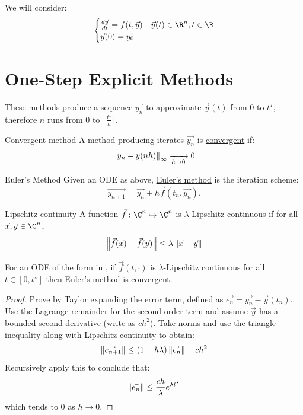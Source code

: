 \documentclass[../Main.tex]{subfiles}
\begin{document}
We will consider:
\begin{equation}
    \begin{cases}
        \frac{d\vec{y}}{dt} = f(t, \vec{y}) & \vec{y}(t) \in \R^n, t \in \R \\
        \vec{y}(0) = \vec{y_0} & 
    \end{cases}
    \label{eqnGeneralODE}
\end{equation}
\section{One-Step Explicit Methods}
These methods produce a sequence $\vec{y_n}$ to approximate $\vec{y}(t)$ from $0$ to $t^\star$, therefore $n$ runs from $0$ to $\lfloor \frac{t^\star}{h}\rfloor$.
\begin{definition}{Convergent method}
    A method producing iterates $\vec{y_n}$ is \underline{convergent} if:
    \begin{equation*}
        \left\|y_n - y(nh)\right\|_{\infty} \xrightarrow[h \to 0]{} 0
    \end{equation*}
\end{definition}
\begin{definition}{Euler's Method}
    Given an ODE as above, \underline{Euler's method} is the iteration scheme:
    \begin{equation*}
        \vec{y_{n+1}} = \vec{y_{n}} + h \vec{f}(t_n, \vec{y_{n}}).
    \end{equation*}
\end{definition}
\begin{definition}{Lipschitz continuity}
    A function $\vec{f} : \C^n \mapsto \C^n$ is \underline{$\lambda$-Lipschitz continuous} if for all $\vec{x}, \vec{y} \in \C^n$,
    \begin{equation*}
        \left\|\vec{f}(\vec{x}) - \vec{f}(\vec{y})\right\| \leq \lambda \left\|\vec{x} - \vec{y}\right\|
    \end{equation*}
\end{definition}
\begin{theorem}
    For an ODE of the form in , if $\vec{f}(t, \cdot)$ is $\lambda$-Lipschitz continuous for all $t \in [0, t^\star]$ then Euler's method is convergent.
    \label{thmEulerConvergence}
\end{theorem}
\begin{proof}
    Prove by Taylor expanding the error term, defined as $\vec{e_n} = \vec{y_n} - \vec{y}(t_n)$. Use the Lagrange remainder for the second order term and assume $\vec{y}$ has a bounded second derivative (write as $c h^2$). Take norms and use the triangle inequality along with Lipschitz continuity to obtain:
    \begin{equation*}
        \left\|\vec{e_{n+1}}\right\| \leq (1 + h \lambda)\left\|\vec{e_n}\right\| + ch^2
    \end{equation*}
    Recursively apply this to conclude that:
    \begin{equation*}
        \left\|\vec{e_{n}}\right\| \leq \frac{ch}{\lambda}e^{\lambda t^\star}
    \end{equation*}
    which tends to $0$ as $h \to 0$.
\end{proof}
\end{document}
